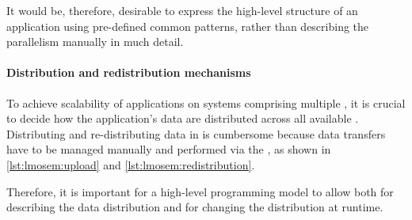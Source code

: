 It would be, therefore, desirable to express the high-level structure of an application using pre-defined common patterns, rather than describing the parallelism manually in much detail.

\paragraph{Distribution and redistribution mechanisms}
To achieve scalability of applications on systems comprising multiple \GPUs, it is crucial to decide how the application's data are distributed across all available \GPUs.
Distributing and re-distributing data in \OpenCL is cumbersome because data transfers have to be managed manually and performed via the \CPU, as shown in \autoref{lst:lmosem:upload} and \autoref{lst:lmosem:redistribution}.

Therefore, it is important for a high-level programming model to allow both for describing the data distribution and for changing the distribution at runtime.
